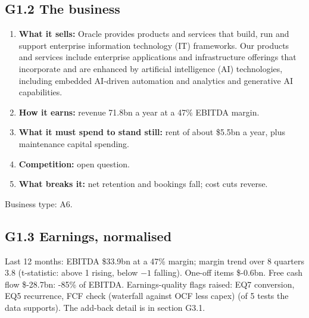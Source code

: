 \documentclass[11pt,a4paper]{article}
\begin{document}
\subsection*{G1.2 The business}
\begin{enumerate}
\item \textbf{What it sells:} Oracle provides products and services that build, run and support enterprise information technology (IT) frameworks. Our products and services include enterprise applications and infrastructure offerings that incorporate and are enhanced by artificial intelligence (AI) technologies, including embedded AI-driven automation and analytics and generative AI capabilities.
\item \textbf{How it earns:} revenue 71.8bn a year at a 47\% EBITDA margin.
\item \textbf{What it must spend to stand still:} rent of about \$5.5bn a year, plus maintenance capital spending.
\item \textbf{Competition:} open question.
\item \textbf{What breaks it:} net retention and bookings fall; cost cuts reverse.
\end{enumerate}
Business type: A6.
\subsection*{G1.3 Earnings, normalised}
Last 12 months: EBITDA \$33.9bn at a 47\% margin; margin trend over 8 quarters 3.8 (t-statistic: above 1 rising, below $-1$ falling). One-off items \$-0.6bn. Free cash flow \$-28.7bn: -85\% of EBITDA. Earnings-quality flags raised: EQ7 conversion, EQ5 recurrence, FCF check (waterfall against OCF less capex) (of 5 tests the data supports). The add-back detail is in section G3.1.
\end{document}

